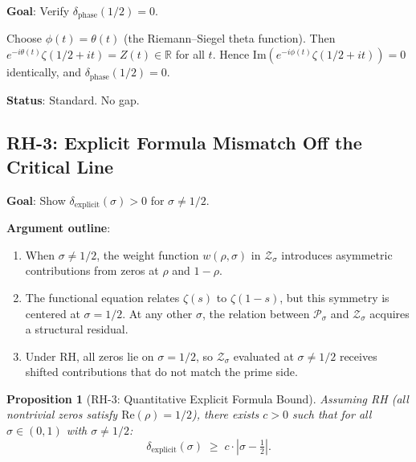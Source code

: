 \documentclass[11pt]{article}
\newtheorem{proposition}[lemma]{Proposition}
\theoremstyle{definition}
\begin{document}
\textbf{Goal}: Verify $\delta_{\mathrm{phase}}(1/2) = 0$.

Choose $\phi(t) = \theta(t)$ (the Riemann--Siegel theta function).
Then $e^{-i\theta(t)} \zeta(1/2 + it) = Z(t) \in \mathbb{R}$ for all $t$.
Hence $\mathrm{Im}(e^{-i\phi(t)} \zeta(1/2 + it)) = 0$ identically,
and $\delta_{\mathrm{phase}}(1/2) = 0$.

\textbf{Status}: Standard.  No gap.

\subsection{RH-3: Explicit Formula Mismatch Off the Critical Line}

\textbf{Goal}: Show $\delta_{\mathrm{explicit}}(\sigma) > 0$ for $\sigma \neq 1/2$.

\textbf{Argument outline}:
\begin{enumerate}
  \item When $\sigma \neq 1/2$, the weight function $w(\rho, \sigma)$ in
    $\mathcal{Z}_\sigma$ introduces asymmetric contributions from zeros
    at $\rho$ and $1 - \rho$.
  \item The functional equation relates $\zeta(s)$ to $\zeta(1-s)$,
    but this symmetry is centered at $\sigma = 1/2$.
    At any other $\sigma$, the relation between $\mathcal{P}_\sigma$
    and $\mathcal{Z}_\sigma$ acquires a structural residual.
  \item Under RH, all zeros lie on $\sigma = 1/2$, so $\mathcal{Z}_\sigma$
    evaluated at $\sigma \neq 1/2$ receives shifted contributions that
    do not match the prime side.
\end{enumerate}

\begin{proposition}[RH-3: Quantitative Explicit Formula Bound]
\label{prop:RH3}
Assuming RH (all nontrivial zeros satisfy $\mathrm{Re}(\rho) = 1/2$),
there exists $c > 0$ such that for all $\sigma \in (0,1)$ with $\sigma \neq 1/2$:
\[
  \delta_{\mathrm{explicit}}(\sigma) \;\geq\; c \cdot |\sigma - \tfrac{1}{2}|.
\]
\end{proposition}
\end{document}

